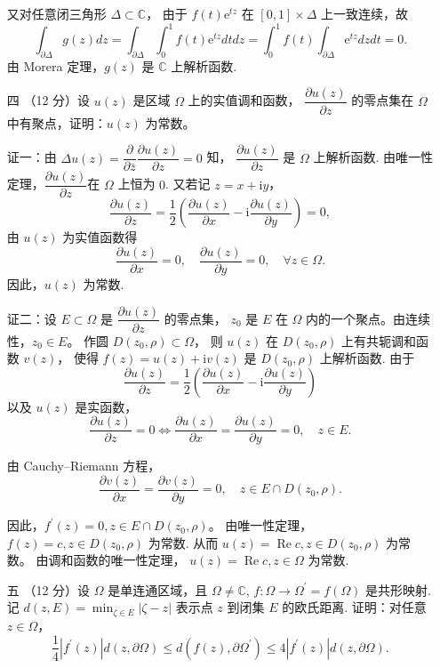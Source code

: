\begin{enumerate}
又对任意闭三角形 $\Delta \subset \mathbb{C}$，
由于 $f(t) \mathrm{e}^{t z}$ 在 $[0,1] \times \Delta$ 上一致连续，故
$$\int_{\partial \Delta} g(z) dz
=\int_{\partial \Delta} \int_{0}^{1} f(t) \mathrm{e}^{t z} dt dz
=\int_{0}^{1} f(t) \int_{\partial \Delta} \mathrm{e}^{t z} dz dt=0.$$
由 Morera 定理，$g(z)$ 是 $\mathbb{C}$ 上解析函数.

\item[四]（12 分）设 $u(z)$ 是区域 $\Omega$ 上的实值调和函数，
$\dfrac{\partial u(z)}{\partial z}$ 的零点集在 $\Omega$ 中有聚点，证明：$u(z)$ 为常数。

证一：由 $\Delta u(z)=\dfrac{\partial}{\partial \bar{z}} \dfrac{\partial u(z)}{\partial z}=0$ 知，
$\dfrac{\partial u(z)}{\partial z}$ 是 $\Omega$ 上解析函数. 
由唯一性定理，$\dfrac{\partial u(z)}{\partial z}$在 $\Omega$ 上恒为 $0$. 
又若记 $z=x+\mathrm{i} y$，
$$\frac{\partial u(z)}{\partial z}
=\frac{1}{2}\left(\frac{\partial u(z)}{\partial x}
-\mathrm{i} \frac{\partial u(z)}{\partial y}\right)=0,$$
由 $u(z)$ 为实值函数得
$$\frac{\partial u(z)}{\partial x}=0, \quad \frac{\partial u(z)}{\partial y}=0, 
\quad \forall z \in \Omega.$$
因此，$u(z)$ 为常数.

证二：设 $E \subset \Omega$ 是 $\dfrac{\partial u(z)}{\partial z}$ 的零点集，
$z_{0}$ 是 $E$ 在 $\Omega$ 内的一个聚点。由连续性，$z_{0} \in E$。
作圆 $D(z_{0}, \rho) \subset \Omega$，
则 $u(z)$ 在 $D(z_{0}, \rho)$ 上有共轭调和函数 $v(z)$，
使得 $f(z)=u(z)+\mathrm{i} v(z)$ 是 $D(z_{0}, \rho)$ 上解析函数. 由于
$$\frac{\partial u(z)}{\partial z}
=\frac{1}{2}\left(\frac{\partial u(z)}{\partial x}
-\mathrm{i} \frac{\partial u(z)}{\partial y}\right)$$
以及 $u(z)$ 是实函数，
$$\frac{\partial u(z)}{\partial z}=0 \Longleftrightarrow 
\frac{\partial u(z)}{\partial x}=\frac{\partial u(z)}{\partial y}=0, 
\quad z \in E.$$

由 Cauchy--Riemann 方程，
$$\frac{\partial v(z)}{\partial x}=\frac{\partial v(z)}{\partial y}=0, \quad 
z \in E \cap D(z_{0}, \rho).$$

因此，$f^{\prime}(z)=0, z \in E \cap D(z_{0}, \rho)$。
由唯一性定理，$f(z)=c, z \in D(z_{0}, \rho)$ 为常数.
从而 $u(z)=\operatorname{Re} c, z \in D(z_{0}, \rho)$ 为常数。
由调和函数的唯一性定理， $u(z)=\operatorname{Re} c, z \in \Omega$ 为常数.

\item[五]（12 分）设 $\Omega$ 是单连通区域，且 $\Omega \neq \mathbb{C}$, 
$f: \Omega \rightarrow \Omega^{\prime}=f(\Omega)$ 是共形映射.
记 $d(z, E)=\min_{\zeta \in E}|\zeta-z|$ 表示点 $z$ 到闭集 $E$ 的欧氏距离.
证明：对任意 $z \in \Omega$，
$$\frac{1}{4}\left|f^{\prime}(z)\right| d(z, \partial \Omega) 
\leq d(f(z), \partial \Omega^{\prime}) 
\leq 4\left|f^{\prime}(z)\right| d(z, \partial \Omega).$$


\end{enumerate}

